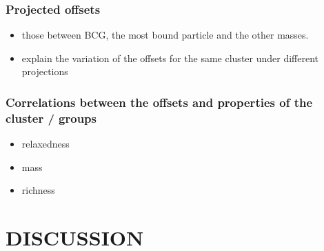 \subsubsection{Projected offsets}
\begin{itemize}
\item those between BCG, the most bound particle and the other masses. 
\item explain the variation of the offsets for the same cluster under different 
projections 
\end{itemize}

% 
% 
% 
% 

\subsubsection{Correlations between the offsets and properties of the cluster / groups}
\begin{itemize}
\item relaxedness
\item mass 
\item richness  
\end{itemize}


\section{DISCUSSION}




